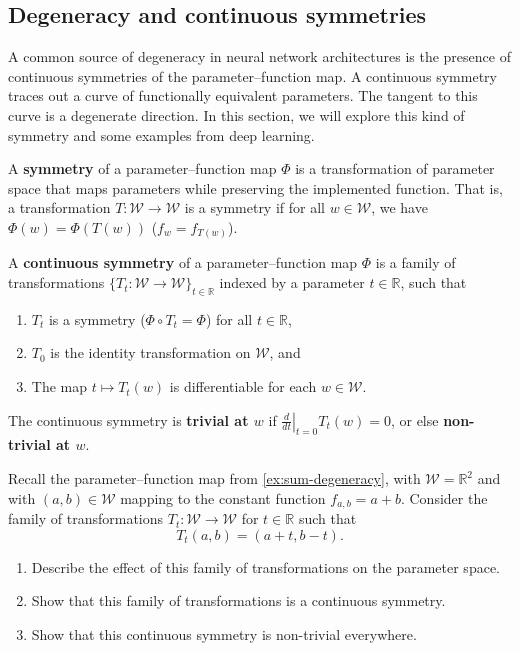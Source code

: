 \documentclass[11pt]{article}
\newcommand{\R}{\mathbb{R}}
\newcommand{\W}{\mathcal{W}}
\begin{document}
\subsection{Degeneracy and continuous symmetries}

A common source of degeneracy in neural network architectures is the
presence of continuous symmetries of the parameter--function map. A continuous
symmetry traces out a curve of functionally equivalent parameters. The tangent
to this curve is a degenerate direction. In this section, we will explore this
kind of symmetry and some examples from deep learning.

A \textbf{symmetry} of a parameter--function map $\Phi$ is a transformation of
parameter space that maps parameters while preserving the implemented function.
That is, a transformation
    $T : \W \to \W$
is a symmetry if for all $w \in \W$, we have
    $\Phi(w) = \Phi(T(w))$ ($f_w = f_{T(w)}$).

A \textbf{continuous symmetry} of a parameter--function map $\Phi$ is a family
of transformations
    $\{T_t : \W \to \W\}_{t \in \R}$
indexed by a parameter $t\in\R$, such that
\begin{enumerate}[label=(\roman*)]
    \item $T_t$ is a symmetry ($\Phi \circ T_t = \Phi$) for all $t \in \R$,
    \item $T_0$ is the identity transformation on $\W$, and
    \item The map $t \mapsto T_t(w)$ is differentiable for each $w \in \W$.
\end{enumerate}
The continuous symmetry is \textbf{trivial at $w$} if
    $\left.\frac{d}{dt}\right|_{t=0}  T_t(w) = 0$,
or else \textbf{non-trivial at $w$}.

\begin{exercise}
    \label{ex:sum-symmetry}
    Recall the parameter--function map from \cref{ex:sum-degeneracy}, with $\W
    = \R^2$ and with $(a, b) \in \W$ mapping to the constant function
    $f_{a,b} = a + b$.
    Consider the family of transformations $T_t : \W \to \W$ for $t \in \R$
    such that
        $$T_t(a, b) = (a + t, b - t).$$
    \begin{enumerate}
        \item Describe the effect of this family of transformations on the
            parameter space.
        \item Show that this family of transformations is a continuous symmetry.
        \item Show that this continuous symmetry is non-trivial everywhere.
    \end{enumerate}
\end{exercise}
\end{document}

